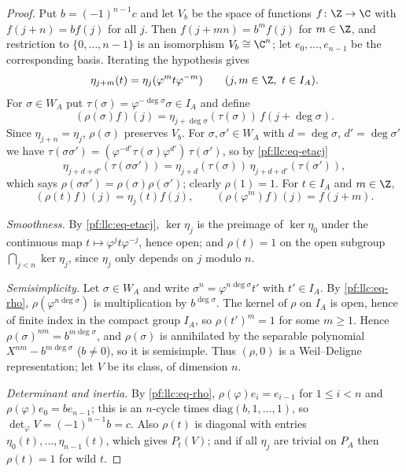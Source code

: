 \begin{proof}
Put $b=(-1)^{n-1}c$ and let $V_b$ be the space of functions $f\colon\Z\to\C$ with $f(j+n)=bf(j)$ for all $j$. Then
$f(j+mn)=b^mf(j)$ for $m\in\Z$, and restriction to $\{0,\dots,n-1\}$ is an isomorphism $V_b\cong\C^n$; let
$e_0,\dots,e_{n-1}$ be the corresponding basis. Iterating the hypothesis gives
\begin{equation}\label{pf:llc:eq-etacj}
  \eta_{j+m}(t)=\eta_j(\varphi^mt\varphi^{-m})\qquad(j,m\in\Z,\ t\in I_A).
\end{equation}
For $\sigma\in W_A$ put $\tau(\sigma)=\varphi^{-\deg\sigma}\sigma\in I_A$ and define
\[
  (\rho(\sigma)f)(j)=\eta_{j+\deg\sigma}(\tau(\sigma))\,f(j+\deg\sigma).
\]
Since $\eta_{j+n}=\eta_j$, $\rho(\sigma)$ preserves $V_b$. For $\sigma,\sigma'\in W_A$ with $d=\deg\sigma$, $d'=\deg\sigma'$ we
have $\tau(\sigma\sigma')=(\varphi^{-d'}\tau(\sigma)\varphi^{d'})\,\tau(\sigma')$, so by \eqref{pf:llc:eq-etacj}
\[
  \eta_{j+d+d'}(\tau(\sigma\sigma'))=\eta_{j+d}(\tau(\sigma))\,\eta_{j+d+d'}(\tau(\sigma')),
\]
which says $\rho(\sigma\sigma')=\rho(\sigma)\rho(\sigma')$; clearly $\rho(1)=1$. For $t\in I_A$ and $m\in\Z$,
\begin{equation}\label{pf:llc:eq-rho}
  (\rho(t)f)(j)=\eta_j(t)f(j),\qquad(\rho(\varphi^m)f)(j)=f(j+m).
\end{equation}

\emph{Smoothness.} By \eqref{pf:llc:eq-etacj}, $\ker\eta_j$ is the preimage of $\ker\eta_0$ under the continuous map
$t\mapsto\varphi^jt\varphi^{-j}$, hence open; and $\rho(t)=1$ on the open subgroup $\bigcap_{j<n}\ker\eta_j$, since
$\eta_j$ only depends on $j$ modulo $n$.

\emph{Semisimplicity.} Let $\sigma\in W_A$ and write $\sigma^n=\varphi^{n\deg\sigma}t'$ with $t'\in I_A$. By
\eqref{pf:llc:eq-rho}, $\rho(\varphi^{n\deg\sigma})$ is multiplication by $b^{\deg\sigma}$. The kernel of $\rho$ on $I_A$
is open, hence of finite index in the compact group $I_A$, so $\rho(t')^m=1$ for some $m\ge1$. Hence
$\rho(\sigma)^{nm}=b^{m\deg\sigma}$, and $\rho(\sigma)$ is annihilated by the separable polynomial
$X^{nm}-b^{m\deg\sigma}$ ($b\ne0$), so it is semisimple. Thus $(\rho,0)$ is a Weil--Deligne representation;
let $V$ be its class, of dimension $n$.

\emph{Determinant and inertia.} By \eqref{pf:llc:eq-rho}, $\rho(\varphi)e_i=e_{i-1}$ for $1\le i<n$ and
$\rho(\varphi)e_0=be_{n-1}$; this is an $n$-cycle times $\mathrm{diag}(b,1,\dots,1)$, so $\det_\varphi
V=(-1)^{n-1}b=c$. Also $\rho(t)$ is diagonal with entries $\eta_0(t),\dots,\eta_{n-1}(t)$, which gives $P_t(V)$; and if
all $\eta_j$ are trivial on $P_A$ then $\rho(t)=1$ for wild $t$.


\end{proof}

